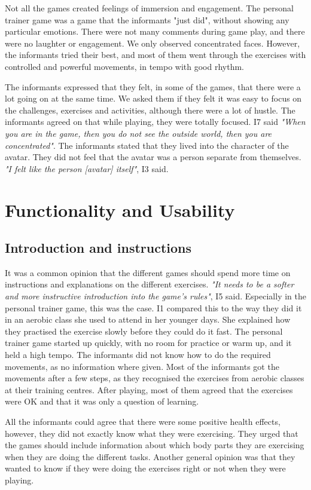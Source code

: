 Not all the games created feelings of immersion and engagement. The personal trainer game was a game that the informants "just did", without showing any particular emotions. There were not many comments during game play, and there were no laughter or engagement. We only observed concentrated faces. However, the informants tried their best, and most of them went through the exercises with controlled and powerful movements, in tempo with good rhythm.       

The informants expressed that they felt, in some of the games, that there were a lot going on at the same time. We asked them if they felt it was easy to focus on the challenges, exercises and activities, although there were a lot of hustle. The informants agreed on that while playing, they were totally focused. I7 said \emph{"When you are in the game, then you do not see the outside world, then you are concentrated"}. The informants stated that they lived into the character of the avatar. They did not feel that the avatar was a person separate from themselves. \emph{"I felt like the person [avatar] itself"}, I3 said. 

\section{Functionality and Usability}
\subsection{Introduction and instructions}
It was a common opinion that the different games should spend more time on instructions and explanations on the different exercises. \emph{"It needs to be a softer and more instructive introduction into the game's rules"}, I5 said. Especially in the personal trainer game, this was the case. I1 compared this to the way they did it in an aerobic class she used to attend in her younger days. She explained how they practised the exercise slowly before they could do it fast. The personal trainer game started up quickly, with no room for practice or warm up, and it held a high tempo. The informants did not know how to do the required movements, as no information where given. Most of the informants got the movements after a few steps, as they recognised the exercises from aerobic classes at their training centres. After playing, most of them agreed that the exercises were OK and that it was only a question of learning. 

All the informants could agree that there were some positive health effects, however, they did not exactly know what they were exercising. They urged that the games should include information about which body parts they are exercising when they are doing the different tasks. Another general opinion was that they wanted to know if they were doing the exercises right or not when they were playing.

